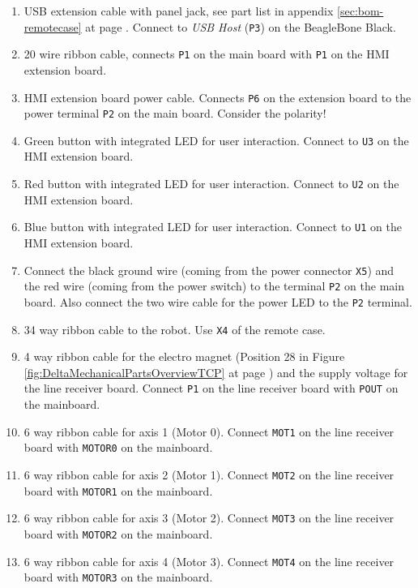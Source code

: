 \begin{enumerate}[(1)]
	\item USB extension cable with panel jack, see part list in appendix \ref{sec:bom-remotecase} at page \pageref{sec:bom-remotecase}. Connect to \textit{USB Host} (\texttt{P3}) on the BeagleBone Black.
	\item 20 wire ribbon cable, connects \texttt{P1} on the main board with \texttt{P1} on the HMI extension board. 
	\item HMI extension board power cable. Connects \texttt{P6} on the extension board to the power terminal \texttt{P2} on the main board. Consider the polarity!
	\item Green button with integrated LED for user interaction. Connect to \texttt{U3} on the HMI extension board.
	\item Red button with integrated LED for user interaction. Connect to \texttt{U2} on the HMI extension board.
	\item Blue button with integrated LED for user interaction. Connect to \texttt{U1} on the HMI extension board.
	\item Connect the black ground wire (coming from the power connector \texttt{X5}) and the red wire (coming from the power switch) to the terminal \texttt{P2} on the main board. Also connect the two wire cable for the power LED to the \texttt{P2} terminal.
	\item 34 way ribbon cable to the robot. Use \texttt{X4} of the remote case.
	\item 4 way ribbon cable for the electro magnet (Position 28 in Figure \ref{fig:DeltaMechanicalPartsOverviewTCP} at page \pageref{fig:DeltaMechanicalPartsOverviewTCP}) and the supply voltage for the line receiver board. Connect \texttt{P1} on the line receiver board with \texttt{POUT} on the mainboard.
	\item 6 way ribbon cable for axis 1 (Motor 0). Connect \texttt{MOT1} on the line receiver board with \texttt{MOTOR0} on the mainboard.
	\item 6 way ribbon cable for axis 2 (Motor 1). Connect \texttt{MOT2} on the line receiver board with \texttt{MOTOR1} on the mainboard.
	\item 6 way ribbon cable for axis 3 (Motor 2). Connect \texttt{MOT3} on the line receiver board with \texttt{MOTOR2} on the mainboard.
	\item 6 way ribbon cable for axis 4 (Motor 3). Connect \texttt{MOT4} on the line receiver board with \texttt{MOTOR3} on the mainboard.
\end{enumerate}

